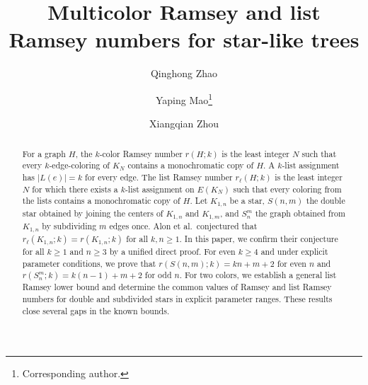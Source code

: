 \documentclass[11pt]{article}
\theoremstyle{definition}
\theoremstyle{remark}
\begin{document}
\title{Multicolor Ramsey and list Ramsey numbers for star-like trees}

\author[1]{Qinghong Zhao}
\author[2]{Yaping Mao\thanks{Corresponding author.}}
\author[3]{Xiangqian Zhou}




\date{}

\maketitle


\begin{abstract}
For a graph \(H\), the \(k\)-color Ramsey number \(r(H;k)\) is the least integer \(N\) such that every \(k\)-edge-coloring of \(K_N\) contains a monochromatic copy of \(H\). A \(k\)-list assignment has \(|L(e)|=k\) for every edge. The list Ramsey number \(r_\ell(H;k)\) is the least integer \(N\) for which there exists a \(k\)-list assignment on \(E(K_N)\) such that every coloring from the lists contains a monochromatic copy of \(H\). Let \(K_{1,n}\) be a star, \(S(n,m)\) the double star obtained by joining the centers of \(K_{1,n}\) and \(K_{1,m}\), and \(S_n^m\) the graph obtained from \(K_{1,n}\) by subdividing \(m\) edges once. Alon et al.\ conjectured that \(r_\ell(K_{1,n};k)=r(K_{1,n};k)\) for all \(k,n\ge1\). In this paper, we confirm their conjecture for all \(k\ge1\) and \(n\ge3\) by a unified direct proof. For even \(k\ge4\) and under explicit parameter conditions, we prove that \(r(S(n,m);k)=kn+m+2\) for even \(n\) and \(r(S_n^m;k)=k(n-1)+m+2\) for odd \(n\). For two colors, we establish a general list Ramsey lower bound and determine the common values of Ramsey and list Ramsey numbers for double and subdivided stars in explicit parameter ranges. These results close several gaps in the known bounds.


\end{abstract}
\end{document}
